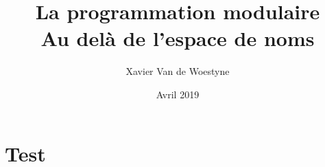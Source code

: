\documentclass[11pt]{article}
\author{Xavier Van de Woestyne}
\date{Avril 2019}
\title{La programmation modulaire\\\medskip
\large Au delà de l'espace de noms}
\begin{document}
\maketitle
\tableofcontents


\section{Test}
\label{sec:org11a6a33}
\end{document}
